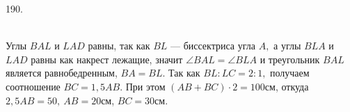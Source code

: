 190. \begin{figure}[ht!]
\end{figure}\\
Углы $BAL$ и $LAD$ равны, так как $BL$ --- биссектриса угла $A,$ а углы $BLA$ и $LAD$ равны как накрест лежащие, значит $\angle BAL=\angle BLA$ и треугольник $BAL$ является равнобедренным, $BA=BL.$ Так как $BL:LC=2:1,$ получаем соотношение $BC=1,5AB.$ При этом $(AB+BC)\cdot2=100$см, откуда $2,5AB=50,\ AB=20$см, $BC=30$см.\\
